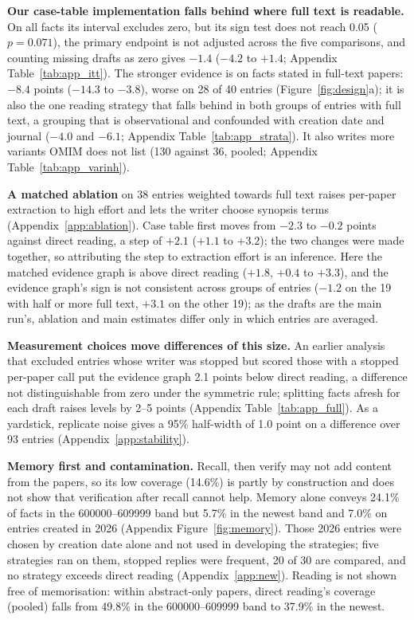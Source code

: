 \documentclass{article} %
\begin{document}
\textbf{Our case-table implementation falls behind where full text is readable.} On all facts its interval excludes zero, but its sign test does not reach 0.05 ($p=0.071$), the primary endpoint is not adjusted across the five comparisons, and counting missing drafts as zero gives $-1.4$ ($-4.2$ to $+1.4$; Appendix Table~\ref{tab:app_itt}). The stronger evidence is on facts stated in full-text papers: $-8.4$ points ($-14.3$ to $-3.8$), worse on 28 of 40 entries (Figure~\ref{fig:design}a); it is also the one reading strategy that falls behind in both groups of entries with full text, a grouping that is observational and confounded with creation date and journal ($-4.0$ and $-6.1$; Appendix Table~\ref{tab:app_strata}). It also writes more variants OMIM does not list (130 against 36, pooled; Appendix Table~\ref{tab:app_varinh}).

\textbf{A matched ablation} on 38 entries weighted towards full text raises per-paper extraction to high effort and lets the writer choose synopsis terms (Appendix~\ref{app:ablation}). Case table first moves from $-2.3$ to $-0.2$ points against direct reading, a step of $+2.1$ ($+1.1$ to $+3.2$); the two changes were made together, so attributing the step to extraction effort is an inference. Here the matched evidence graph is above direct reading ($+1.8$, $+0.4$ to $+3.3$), and the evidence graph's sign is not consistent across groups of entries ($-1.2$ on the 19 with half or more full text, $+3.1$ on the other 19); as the drafts are the main run's, ablation and main estimates differ only in which entries are averaged.

\textbf{Measurement choices move differences of this size.} An earlier analysis that excluded entries whose writer was stopped but scored those with a stopped per-paper call put the evidence graph 2.1 points below direct reading, a difference not distinguishable from zero under the symmetric rule; splitting facts afresh for each draft raises levels by 2--5 points (Appendix Table~\ref{tab:app_full}). As a yardstick, replicate noise gives a 95\% half-width of 1.0 point on a difference over 93 entries (Appendix~\ref{app:stability}).

\textbf{Memory first and contamination.} Recall, then verify may not add content from the papers, so its low coverage (14.6\%) is partly by construction and does not show that verification after recall cannot help. Memory alone conveys 24.1\% of facts in the 600000--609999 band but 5.7\% in the newest band and 7.0\% on entries created in 2026 (Appendix Figure~\ref{fig:memory}). Those 2026 entries were chosen by creation date alone and not used in developing the strategies; five strategies ran on them, stopped replies were frequent, 20 of 30 are compared, and no strategy exceeds direct reading (Appendix~\ref{app:new}). Reading is not shown free of memorisation: within abstract-only papers, direct reading's coverage (pooled) falls from 49.8\% in the 600000--609999 band to 37.9\% in the newest.
\end{document}
